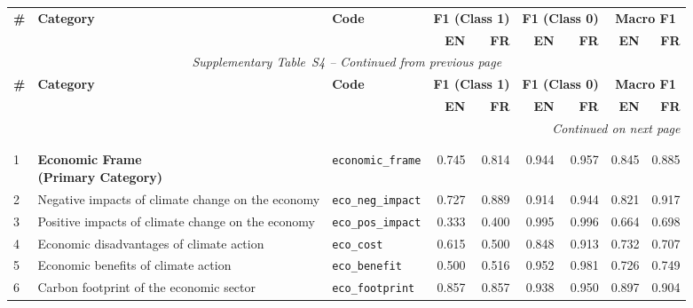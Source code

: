 \label{tab:training_metrics_s4}
\begin{longtable}{p{0.4cm}p{4.0cm}p{3.0cm}rrrrrr}
\toprule
\multirow{2}{*}{\textbf{\#}} & \multirow{2}{*}{\textbf{Category}} & \multirow{2}{*}{\textbf{Code}} & \multicolumn{2}{c}{\textbf{F1 (Class 1)}} & \multicolumn{2}{c}{\textbf{F1 (Class 0)}} & \multicolumn{2}{c}{\textbf{Macro F1}} \\
\cmidrule(lr){4-5} \cmidrule(lr){6-7} \cmidrule(lr){8-9}
& & & \textbf{EN} & \textbf{FR} & \textbf{EN} & \textbf{FR} & \textbf{EN} & \textbf{FR} \\
\midrule
\endfirsthead
\multicolumn{9}{c}{\textit{Supplementary Table~S4 -- Continued from previous page}} \\
\toprule
\multirow{2}{*}{\textbf{\#}} & \multirow{2}{*}{\textbf{Category}} & \multirow{2}{*}{\textbf{Code}} & \multicolumn{2}{c}{\textbf{F1 (Class 1)}} & \multicolumn{2}{c}{\textbf{F1 (Class 0)}} & \multicolumn{2}{c}{\textbf{Macro F1}} \\
\cmidrule(lr){4-5} \cmidrule(lr){6-7} \cmidrule(lr){8-9}
& & & \textbf{EN} & \textbf{FR} & \textbf{EN} & \textbf{FR} & \textbf{EN} & \textbf{FR} \\
\midrule
\endhead
\midrule
\multicolumn{9}{r}{\textit{Continued on next page}} \\
\endfoot
\bottomrule
\endlastfoot
\multicolumn{9}{l}{\cellcolor{gray!10}\textbf{MAIN FRAMES}} \\
\midrule
\rowcolor{gray!8}
\multicolumn{9}{l}{\textit{Economic Frame}} \\
\midrule
1 & \textbf{Economic Frame\newline (Primary Category)} & \texttt{economic\_frame} & 0.745 & 0.814 & 0.944 & 0.957 & 0.845 & 0.885 \\
\cmidrule(lr){1-9}
2 & Negative impacts of climate change on the economy & \texttt{eco\_neg\_impact} & 0.727 & 0.889 & 0.914 & 0.944 & 0.821 & 0.917 \\
3 & Positive impacts of climate change on the economy & \texttt{eco\_pos\_impact} & 0.333 & 0.400 & 0.995 & 0.996 & 0.664 & 0.698 \\
4 & Economic disadvantages of climate action & \texttt{eco\_cost} & 0.615 & 0.500 & 0.848 & 0.913 & 0.732 & 0.707 \\
5 & Economic benefits of climate action & \texttt{eco\_benefit} & 0.500 & 0.516 & 0.952 & 0.981 & 0.726 & 0.749 \\
6 & Carbon footprint of the economic sector & \texttt{eco\_footprint} & 0.857 & 0.857 & 0.938 & 0.950 & 0.897 & 0.904 \\

\end{longtable}
